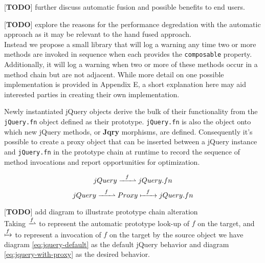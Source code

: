 \documentclass[preprint]{sigplanconf}
\begin{document}
[\textbf{TODO}] further discuss automatic fusion and possible benefits to end users.

[\textbf{TODO}] explore the reasons for the performance degredation with the automatic approach as it may be relevant to the hand fused approach.
\\

Instead we propose a small library that will log a warning any time two or more methods are invoked in sequence when each provides the \verb|composable| property. Additionally, it will log a warning when two or more of these methods occur in a method chain but are not adjacent. While more detail on one possible implementation is provided in Appendix E, a short explanation here may aid interested parties in creating their own implementation.

Newly instantiated jQuery objects derive the bulk of their functionality from the \verb|jQuery.fn| object defined as their prototype. \verb|jQuery.fn| is also the object onto which new jQuery methods, or \textbf{Jqry} morphisms, are defined. Consequently it's possible to create a proxy object that can be inserted between a jQuery instance and \verb|jQuery.fn| in the prototype chain at runtime to record the sequence of method invocations and report opportunities for optimization.

\begin{figure}[!ht]
\begin{equation} \label{eq:jquery-default}
 jQuery \xrightharpoonup{\ \ f\ \ } jQuery.fn
\end{equation}
\begin{equation} \label{eq:jquery-with-proxy}
 jQuery \xrightharpoonup{\ \ f\ \ } Proxy \xmapsto{\ \ f\ \ } jQuery.fn
\end{equation}
\end{figure}

[\textbf{TODO}] add diagram to illustrate prototype chain alteration
\\

Taking \begin{math}\xrightharpoonup{f}\end{math} to represent the automatic prototype look-up of \begin{math}f\end{math} on the target, and \begin{math}\xmapsto{f}\end{math} to represent a invocation of \begin{math}f\end{math} on the target by the source object we have diagram \ref{eq:jquery-default} as the default jQuery behavior and diagram \ref{eq:jquery-with-proxy} as the desired behavior.
\end{document}
